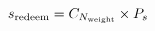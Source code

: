 \begin{equation}
    \label{eq:chip_redeem}
    s_\text{redeem} = C_{N_\text{weight}} \times P_{s}
\end{equation}









